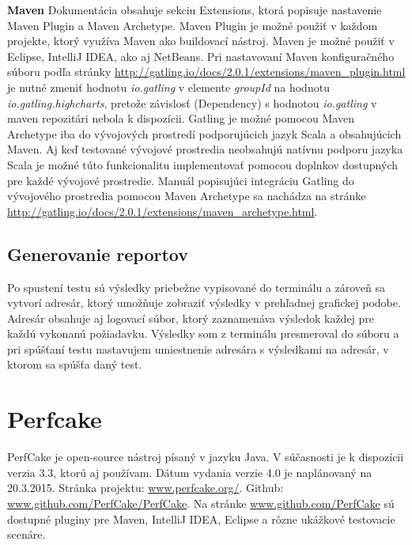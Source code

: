 \documentclass[12pt,oneside,final]{fithesis-utf8}
\begin{document}
\newpage
\noindent \textbf{Maven}
\newline
Dokumentácia obsahuje sekciu Extensions, ktorá popisuje nastavenie Maven Plugin a Maven Archetype.
\newline Maven Plugin je možné použiť v každom projekte, ktorý využíva Maven ako buildovací nástroj. Maven je možné použiť v Eclipse, IntelliJ IDEA, ako aj NetBeans. Pri nastavovaní Maven konfiguračného súboru podľa stránky \url{http://gatling.io/docs/2.0.1/extensions/maven_plugin.html} je nutné zmeniť hodnotu \textit{io.gatling} v elemente \textit{groupId} na hodnotu \textit{io.gatling.highcharts}, pretože závislosť (Dependency) s hodnotou \textit{io.gatling} v maven repozitári nebola k dispozícii.
\newline
\newline
Gatling je možné pomocou Maven Archetype iba do vývojových prostredí podporujúcich jazyk Scala a obsahujúcich Maven. Aj keď testované vývojové prostredia neobsahujú natívnu podporu jazyka Scala je možné túto funkcionalitu implementovať pomocou doplnkov dostupných pre každé vývojové prostredie. Manuál popisujúci integráciu Gatling do vývojového prostredia pomocou Maven Archetype sa nachádza na stránke \url{http://gatling.io/docs/2.0.1/extensions/maven_archetype.html}.
\newline

\subsection{Generovanie reportov}
Po spustení testu sú výsledky priebežne vypisované do terminálu a zároveň sa vytvorí adresár, ktorý umožňuje zobraziť výsledky v prehľadnej grafickej podobe. Adresár obsahuje aj logovací súbor, ktorý zaznamenáva výsledok každej pre každú vykonanú požiadavku. Výsledky som z terminálu presmeroval do súboru a pri spúšťaní testu nastavujem umiestnenie adresára s výsledkami na adresár, v ktorom sa spúšťa daný test.

\newpage
\section{Perfcake}
PerfCake je open-source nástroj písaný v jazyku Java. V súčasnosti je k dispozícii verzia 3.3, ktorú aj používam. Dátum vydania verzie 4.0 je naplánovaný na 20.3.2015. Stránka projektu: \url{www.perfcake.org/}. Github: \url{www.github.com/PerfCake/PerfCake}. Na stránke \url{www.github.com/PerfCake} sú dostupné pluginy pre Maven, IntelliJ IDEA, Eclipse a rôzne ukážkové testovacie scenáre. 
\end{document}
